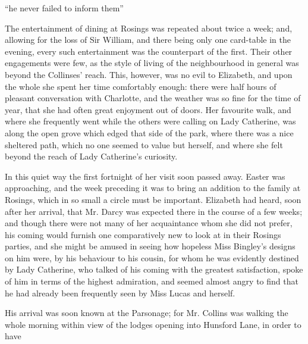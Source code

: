 \documentclass[10pt]{book}
\begin{document}
     “he never failed to inform them”
    

   The entertainment of dining at Rosings was repeated about twice a week;
and, allowing for the loss of Sir William, and there being only one
card-table in the
   evening, every such entertainment was the counterpart
of the first. Their other engagements were few, as the style of living
of the neighbourhood in general was beyond the Collinses’ reach. This,
however, was no evil to Elizabeth, and upon the whole she spent her time
comfortably enough: there were half hours of pleasant conversation with
Charlotte, and the weather was so fine for the time of year, that she
had often great enjoyment out of doors. Her favourite walk, and where
she frequently went while the others were calling on Lady Catherine, was
along the open grove which edged that side of the park, where there was
a nice sheltered path, which no one seemed to value but herself, and
where she felt beyond the reach of Lady Catherine’s curiosity.
  

   In this quiet way the first fortnight of her visit soon passed away.
Easter was approaching, and the week preceding it was to bring an
addition to the family at Rosings, which in so small a circle must be
important. Elizabeth had heard, soon after her arrival, that Mr. Darcy
was expected there in the course of a few weeks; and though there were
not many of her acquaintance whom she did not prefer, his coming would
furnish one comparatively new to look at in their Rosings parties, and
she might be amused in seeing how hopeless Miss Bingley’s designs on him
were, by his behaviour to his cousin, for whom he was evidently destined
by Lady Catherine, who talked of his coming with the greatest
satisfaction, spoke of him in terms of the highest admiration, and
seemed almost angry to find that he had already been frequently seen by
Miss Lucas and herself.
  

   His arrival was soon known at the Parsonage; for Mr. Collins was walking
the whole morning within view of the lodges opening into Hunsford Lane,
in order to have
  
\end{document}
